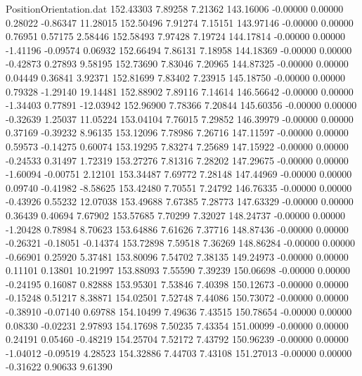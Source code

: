 \begin{filecontents}{PositionOrientation.dat}
 152.43303    7.89258    7.21362   143.16006   -0.00000    0.00000    0.28022   -0.86347   11.28015
 152.50496    7.91274    7.15151   143.97146   -0.00000    0.00000    0.76951    0.57175    2.58446
 152.58493    7.97428    7.19724   144.17814   -0.00000    0.00000   -1.41196   -0.09574    0.06932
 152.66494    7.86131    7.18958   144.18369   -0.00000    0.00000   -0.42873    0.27893    9.58195
 152.73690    7.83046    7.20965   144.87325   -0.00000    0.00000    0.04449    0.36841    3.92371
 152.81699    7.83402    7.23915   145.18750   -0.00000    0.00000    0.79328   -1.29140   19.14481
 152.88902    7.89116    7.14614   146.56642   -0.00000    0.00000   -1.34403    0.77891  -12.03942
 152.96900    7.78366    7.20844   145.60356   -0.00000    0.00000   -0.32639    1.25037   11.05224
 153.04104    7.76015    7.29852   146.39979   -0.00000    0.00000    0.37169   -0.39232    8.96135
 153.12096    7.78986    7.26716   147.11597   -0.00000    0.00000    0.59573   -0.14275    0.60074
 153.19295    7.83274    7.25689   147.15922   -0.00000    0.00000   -0.24533    0.31497    1.72319
 153.27276    7.81316    7.28202   147.29675   -0.00000    0.00000   -1.60094   -0.00751    2.12101
 153.34487    7.69772    7.28148   147.44969   -0.00000    0.00000    0.09740   -0.41982   -8.58625
 153.42480    7.70551    7.24792   146.76335   -0.00000    0.00000   -0.43926    0.55232   12.07038
 153.49688    7.67385    7.28773   147.63329   -0.00000    0.00000    0.36439    0.40694    7.67902
 153.57685    7.70299    7.32027   148.24737   -0.00000    0.00000   -1.20428    0.78984    8.70623
 153.64886    7.61626    7.37716   148.87436   -0.00000    0.00000   -0.26321   -0.18051   -0.14374
 153.72898    7.59518    7.36269   148.86284   -0.00000    0.00000   -0.66901    0.25920    5.37481
 153.80096    7.54702    7.38135   149.24973   -0.00000    0.00000    0.11101    0.13801   10.21997
 153.88093    7.55590    7.39239   150.06698   -0.00000    0.00000   -0.24195    0.16087    0.82888
 153.95301    7.53846    7.40398   150.12673   -0.00000    0.00000   -0.15248    0.51217    8.38871
 154.02501    7.52748    7.44086   150.73072   -0.00000    0.00000   -0.38910   -0.07140    0.69788
 154.10499    7.49636    7.43515   150.78654   -0.00000    0.00000    0.08330   -0.02231    2.97893
 154.17698    7.50235    7.43354   151.00099   -0.00000    0.00000    0.24191    0.05460   -0.48219
 154.25704    7.52172    7.43792   150.96239   -0.00000    0.00000   -1.04012   -0.09519    4.28523
 154.32886    7.44703    7.43108   151.27013   -0.00000    0.00000   -0.31622    0.90633    9.61390

\end{filecontents}
